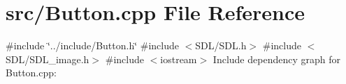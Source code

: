 \section{src/\-Button.cpp \-File \-Reference}
\label{_button_8cpp}
{\ttfamily \#include \char`\"{}../include/\-Button.\-h\char`\"{}}\*
{\ttfamily \#include $<$\-S\-D\-L/\-S\-D\-L.\-h$>$}\*
{\ttfamily \#include $<$\-S\-D\-L/\-S\-D\-L\-\_\-image.\-h$>$}\*
{\ttfamily \#include $<$iostream$>$}\*
\-Include dependency graph for \-Button.\-cpp\-:
